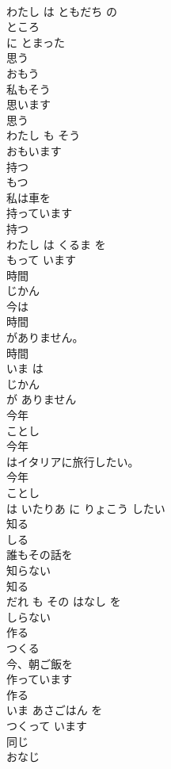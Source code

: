 \documentclass[8pt]{extreport}
\begin{document}
\begin{CJK}{UTF8}{min}
\\	わたし は ともだち の 
\\	ところ
\\	に とまった	
\\	思う	
\\	おもう	
\\	私もそう
\\	思います
\\	思う 
\\	わたし も そう 
\\	おもいます
\\	持つ	
\\	もつ	
\\	私は車を
\\	持っています
\\	持つ 
\\	わたし は くるま を 
\\	もって います
\\	時間	
\\	じかん	
\\	今は
\\	時間
\\	がありません。	
\\	時間 
\\	いま は 
\\	じかん
\\	が ありません	
\\	今年	
\\	ことし	
\\	今年
\\	はイタリアに旅行したい。	
\\	今年 
\\	ことし
\\	は いたりあ に りょこう したい	
\\	知る	
\\	しる	
\\	誰もその話を
\\	知らない
\\	知る 
\\	だれ も その はなし を 
\\	しらない
\\	作る	
\\	つくる	
\\	今、朝ご飯を
\\	作っています
\\	作る 
\\	いま あさごはん を 
\\	つくって います
\\	同じ	
\\	おなじ	

\end{CJK}
\end{document}
